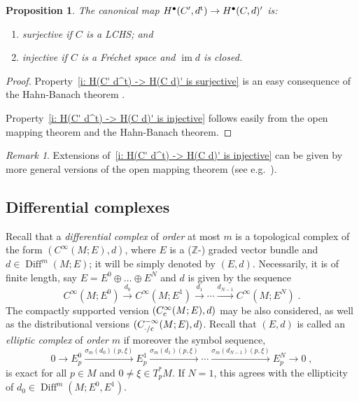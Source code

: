 \documentclass{memo-l}
\theoremstyle{plain}
\newtheorem{prop}[thm]{Proposition}
\theoremstyle{definition}
\theoremstyle{remark}
\newtheorem{rem}[thm]{Remark}
\newcommand{\Z}{\mathbb{Z}}
\newcommand{\im}{\operatorname{im}}
\newcommand{\Diff}{\operatorname{Diff}}
\newcommand{\co}{{\text{\rm c}}}
\newcommand{\trans}{{\text{\rm t}}}
\newcommand{\Cinftyc}{C^\infty_{\text{\rm c}}}
\numberwithin{section}{chapter}
\numberwithin{equation}{section}%
\begin{document}
\begin{prop}\label{p: H(C' d^t) -> H(C d)'}
The canonical map $H^\bullet(C',d^\trans)\to H^\bullet(C,d)'$ is:
\begin{enumerate}[{\rm(i)}]
\item\label{i: H(C' d^t) -> H(C d)' is surjective} surjective if $C$ is a LCHS; and 
\item\label{i: H(C' d^t) -> H(C d)' is injective} injective if $C$ is a Fr\'echet space and $\im d$ is closed.
\end{enumerate}
\end{prop} 

\begin{proof}
Property~\ref{i: H(C' d^t) -> H(C d)' is surjective} is an easy consequence of the Hahn-Banach theorem \cite[Theorem~II.4.2]{Schaefer1971}.

Property~\ref{i: H(C' d^t) -> H(C d)' is injective} follows easily from the open mapping theorem \cite[Theorem~III.2.1]{Schaefer1971} and the Hahn-Banach theorem.
\end{proof}

\begin{rem}\label{r: H(C' d^t) -> H(C d)'}
Extensions of~\ref{i: H(C' d^t) -> H(C d)' is injective} can be given by more general versions of the open mapping theorem (see e.g.\ \cite{Bourles2014}).
\end{rem}


\subsection{Differential complexes}\label{ss: diff complexes}

Recall that a \emph{differential complex} of \emph{order} at most $m$ is a topological complex of the form $(C^\infty(M;E),d)$, where $E$ is a ($\Z$-) graded vector bundle and $d\in\Diff^m(M;E)$; it will be simply denoted by $(E,d)$. Necessarily, it is of finite length, say $E=E^0\oplus\dots\oplus E^N$  and $d$ is given by the sequence
\[
C^\infty(M;E^0) \xrightarrow{d_0} C^\infty(M;E^1) \xrightarrow{d_1} \cdots \xrightarrow{d_{N-1}} C^\infty(M;E^N)\;.
\]
The compactly supported version $(\Cinftyc(M;E),d)$ may be also considered, as well as the distributional versions $(C^{-\infty}_{{\cdot}/\co}(M;E),d)$. Recall that $(E,d)$ is called an \emph{elliptic complex} of \emph{order} $m$ if moreover the symbol sequence,
\begin{equation}\label{symbol sequence}
0\to E^0_p \xrightarrow{\sigma_m(d_0)(p,\xi)} E^1_p \xrightarrow{\sigma_m(d_1)(p,\xi)} \cdots 
\xrightarrow{\sigma_m(d_{N-1})(p,\xi)} E^N_p\to0\;,
\end{equation}
is exact for all $p\in M$ and $0\ne\xi\in T^*_pM$. If $N=1$, this agrees with the ellipticity of $d_0\in\Diff^m(M;E^0,E^1)$.
 
\end{document}
